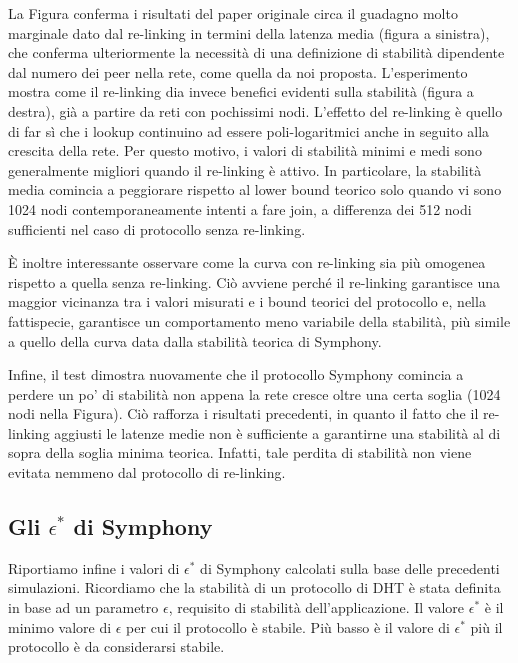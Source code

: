 \documentclass[prodmode,acmtap]{acmlarge}
\begin{document}
La Figura conferma i risultati del paper originale circa il guadagno molto marginale dato dal re-linking in termini della latenza media (figura a sinistra), che conferma ulteriormente la necessità di una definizione di stabilità dipendente dal numero dei peer nella rete, come quella da noi proposta. L'esperimento mostra come il re-linking dia invece benefici evidenti sulla stabilità (figura a destra), già a partire da reti con pochissimi nodi. L'effetto del re-linking è quello di far sì che i lookup continuino ad essere poli-logaritmici anche in seguito alla crescita della rete. Per questo motivo, i valori di stabilità minimi e medi sono generalmente migliori quando il re-linking è attivo. In particolare, la stabilità media comincia a peggiorare rispetto al lower bound teorico solo quando vi sono 1024 nodi contemporaneamente intenti a fare join, a differenza dei 512 nodi sufficienti nel caso di protocollo senza re-linking.

È inoltre interessante osservare come la curva con re-linking sia più omogenea rispetto a quella senza re-linking. Ciò avviene perché il re-linking garantisce una maggior vicinanza tra i valori misurati e i bound teorici del protocollo e, nella fattispecie, garantisce un comportamento meno variabile della stabilità, più simile a quello della curva data dalla stabilità teorica di Symphony.

Infine, il test dimostra nuovamente che il protocollo Symphony comincia a perdere un po' di stabilità non appena la rete cresce oltre una certa soglia (1024 nodi nella Figura). Ciò rafforza i risultati precedenti, in quanto il fatto che il re-linking aggiusti le latenze medie non è sufficiente a garantirne una stabilità al di sopra della soglia minima teorica. Infatti, tale perdita di stabilità non viene evitata nemmeno dal protocollo di re-linking.



\subsection{Gli $\epsilon^*$ di Symphony}
Riportiamo infine i valori di $\epsilon^*$ di Symphony calcolati sulla base delle precedenti simulazioni. Ricordiamo che la stabilità di un protocollo di DHT è stata definita in base ad un parametro $\epsilon$, requisito di stabilità dell'applicazione. Il valore $\epsilon^*$ è il minimo valore di $\epsilon$ per cui il protocollo è stabile. Più basso è il valore di $\epsilon^*$ più il protocollo è da considerarsi stabile.
\end{document}
